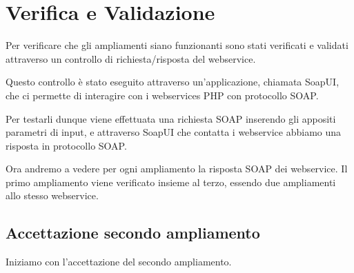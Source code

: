 \newpage

\section{Verifica e Validazione}
\begin{flushleft}
	Per verificare che gli ampliamenti siano funzionanti sono stati verificati e validati attraverso un controllo di richiesta/risposta del webservice.
	\newspace
	
	Questo controllo è stato eseguito attraverso un'applicazione, chiamata SoapUI, che ci permette di interagire con i webservices PHP con protocollo SOAP.
	
	Per testarli dunque viene effettuata una richiesta SOAP inserendo gli appositi parametri di input, e attraverso SoapUI che contatta i webservice abbiamo una risposta in protocollo SOAP.
	\newspace
	
	Ora andremo a vedere per ogni ampliamento la risposta SOAP dei webservice.
	Il primo ampliamento viene verificato insieme al terzo, essendo due ampliamenti allo stesso webservice.
\end{flushleft}
\newpage

\subsection{Accettazione secondo ampliamento}
Iniziamo con l'accettazione del secondo ampliamento.

